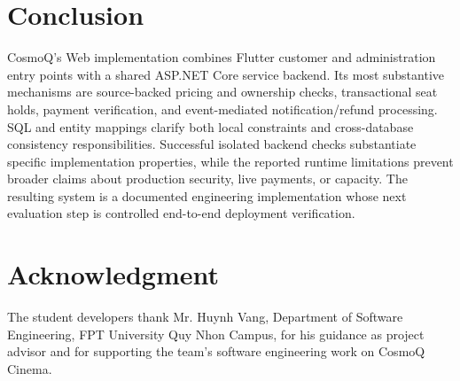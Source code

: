 \documentclass[conference]{IEEEtran}
\begin{document}
\section{Conclusion}
CosmoQ's Web implementation combines Flutter customer and administration entry
points with a shared ASP.NET Core service backend. Its most substantive
mechanisms are source-backed pricing and ownership checks, transactional seat
holds, payment verification, and event-mediated notification/refund processing.
SQL and entity mappings clarify both local constraints and cross-database
consistency responsibilities. Successful isolated backend checks substantiate
specific implementation properties, while the reported runtime limitations
prevent broader claims about production security, live payments, or capacity.
The resulting system is a documented engineering implementation whose next
evaluation step is controlled end-to-end deployment verification.
\par\noindent\begin{minipage}{\columnwidth}
\section*{Acknowledgment}
The student developers thank Mr. Huynh Vang, Department of Software Engineering,
FPT University Quy Nhon Campus, for his guidance as project advisor and for
supporting the team's software engineering work on CosmoQ Cinema.
\end{minipage}\par
\newpage


\end{document}
